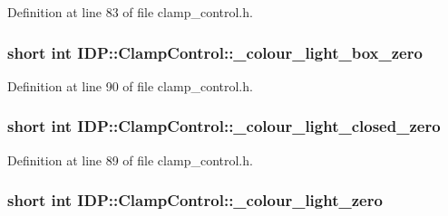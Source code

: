 Definition at line 83 of file clamp\_\-control.h.

\hypertarget{classIDP_1_1ClampControl_acca5d1d3e3e3fc8b148a4889c76b0dc2}{
\subsubsection[{\_\-colour\_\-light\_\-box\_\-zero}]{\setlength{\rightskip}{0pt plus 5cm}short int {\bf IDP::ClampControl::\_\-colour\_\-light\_\-box\_\-zero}}}
\label{classIDP_1_1ClampControl_acca5d1d3e3e3fc8b148a4889c76b0dc2}


Definition at line 90 of file clamp\_\-control.h.

\hypertarget{classIDP_1_1ClampControl_a7639828ac6b5d83131718412b3dd5ca2}{
\subsubsection[{\_\-colour\_\-light\_\-closed\_\-zero}]{\setlength{\rightskip}{0pt plus 5cm}short int {\bf IDP::ClampControl::\_\-colour\_\-light\_\-closed\_\-zero}}}
\label{classIDP_1_1ClampControl_a7639828ac6b5d83131718412b3dd5ca2}


Definition at line 89 of file clamp\_\-control.h.

\hypertarget{classIDP_1_1ClampControl_aa8dfb019900ee99b77e3eeb227d4de18}{
\subsubsection[{\_\-colour\_\-light\_\-zero}]{\setlength{\rightskip}{0pt plus 5cm}short int {\bf IDP::ClampControl::\_\-colour\_\-light\_\-zero}}}
\label{classIDP_1_1ClampControl_aa8dfb019900ee99b77e3eeb227d4de18}


